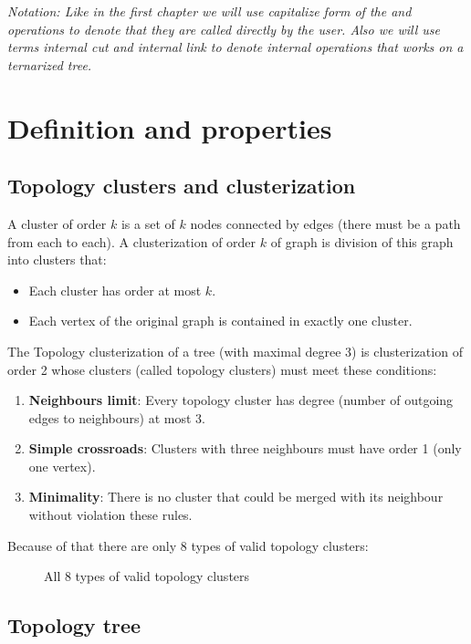 {\it Notation: Like in the first chapter we will use capitalize form of the
\Cut{} and \Link{} operations to denote that they are called directly by the
user. Also we will use terms {\sl internal cut} and {\sl internal link} to
denote internal operations that works on a ternarized tree.}

\section{Definition and properties}

\subsection{Topology clusters and clusterization}

A {\I cluster of order $k$} is a set of $k$ nodes connected by edges (there must
be a path from each to each). A {\I clusterization of order $k$} of graph is
division of this graph into clusters that:
\begin{itemize}
\item Each cluster has order at most $k$.
\item Each vertex of the original graph is contained in exactly one cluster.
\end{itemize}

The {\I Topology clusterization} of a tree (with maximal degree 3) is clusterization
of order 2 whose clusters (called {\I topology clusters}) must meet these conditions:
\begin{enumerate}
\item {\bf Neighbours limit}: Every topology cluster has degree (number of
outgoing edges to neighbours) at most 3.
\item {\bf Simple crossroads}: Clusters with three neighbours must have order 1 (only one vertex).
\item {\bf Minimality}: There is no cluster that could be merged with its neighbour
without violation these rules.
\end{enumerate}

Because of that there are only 8 types of valid topology clusters:

\begin{figure}[h]
\centering
{}
\caption{All 8 types of valid topology clusters}
\end{figure}

\subsection{Topology tree}

